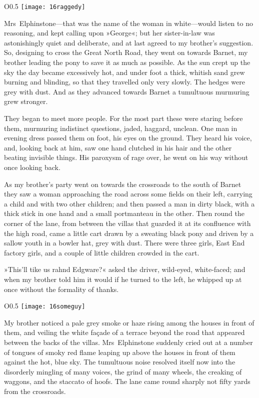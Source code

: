 \begin{wrapfigure}{O}{0.5\textwidth}
\centering
\texttt{[image: 16raggedy]}
\end{wrapfigure}

Mrs~Elphinstone—that was the name of the woman in white—would listen to no reasoning, and kept calling upon »George«; but her sister-in-law was astonishingly quiet and deliberate, and at last agreed to my brother's suggestion. So, designing to cross the Great North Road, they went on towards Barnet, my brother leading the pony to save it as much as possible. As the sun crept up the sky the day became excessively hot, and under foot a thick, whitish sand grew burning and blinding, so that they travelled only very slowly. The hedges were grey with dust. And as they advanced towards Barnet a tumultuous murmuring grew stronger.

They began to meet more people. For the most part these were staring before them, murmuring indistinct questions, jaded, haggard, unclean. One man in evening dress passed them on foot, his eyes on the ground. They heard his voice, and, looking back at him, saw one hand clutched in his hair and the other beating invisible things. His paroxysm of rage over, he went on his way without once looking back.

As my brother's party went on towards the crossroads to the south of Barnet they saw a woman approaching the road across some fields on their left, carrying a child and with two other children; and then passed a man in dirty black, with a thick stick in one hand and a small portmanteau in the other. Then round the corner of the lane, from between the villas that guarded it at its confluence with the high road, came a little cart drawn by a sweating black pony and driven by a sallow youth in a bowler hat, grey with dust. There were three girls, East End factory girls, and a couple of little children crowded in the cart.

»This'll tike us rahnd Edgware?« asked the driver, wild-eyed, white-faced; and when my brother told him it would if he turned to the left, he whipped up at once without the formality of thanks.

\begin{wrapfigure}{O}{0.5\textwidth}
\centering
\texttt{[image: 16someguy]}
\end{wrapfigure}

My brother noticed a pale grey smoke or haze rising among the houses in front of them, and veiling the white façade of a terrace beyond the road that appeared between the backs of the villas. Mrs~Elphinstone suddenly cried out at a number of tongues of smoky red flame leaping up above the houses in front of them against the hot, blue sky. The tumultuous noise resolved itself now into the disorderly mingling of many voices, the grind of many wheels, the creaking of waggons, and the staccato of hoofs. The lane came round sharply not fifty yards from the crossroads.

